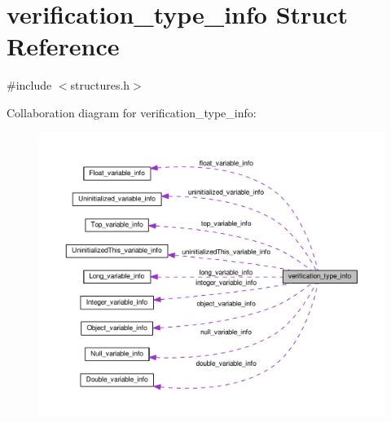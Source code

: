 \hypertarget{structverification__type__info}{}\section{verification\+\_\+type\+\_\+info Struct Reference}
\label{structverification__type__info}


{\ttfamily \#include $<$structures.\+h$>$}



Collaboration diagram for verification\+\_\+type\+\_\+info\+:
\nopagebreak
\begin{figure}[H]
\begin{center}
\leavevmode
\includegraphics[width=350pt]{structverification__type__info__coll__graph}
\end{center}
\end{figure}

